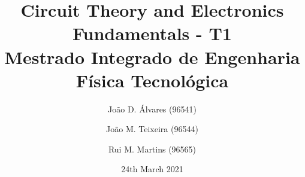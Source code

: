 \title{\textbf{Circuit Theory and Electronics Fundamentals - T1}\\ \normalsize{Mestrado Integrado de Engenharia Física Tecnológica}}
\author[1]{João D. Álvares (96541)}
\author[1]{João M. Teixeira (96544)}
\author[1]{Rui M. Martins (96565)}


\date{24th March 2021}